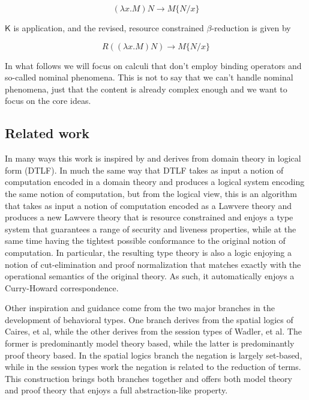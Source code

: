 \documentclass{llncs}
\renewcommand{\:}{\colon}
\begin{document}
\begin{equation*}
  (\lambda x.M)N \rightarrow M\{ N/x \}
\end{equation*}  

$\mathsf{K}$ is application, and the revised, resource constrained $\beta$-reduction is given by

\begin{equation*}
  R((\lambda x.M)N) \rightarrow M\{ N/x \}
\end{equation*}    

In what follows we will focus on calculi that don’t employ binding
operators and so-called nominal phenomena. This is not to say that we
can’t handle nominal phenomena, just that the content is already
complex enough and we want to focus on the core ideas.


\subsection{Related work}
In many ways this work is inspired by and derives from domain theory
in logical form (DTLF). In much the same way that DTLF takes as input
a notion of computation encoded in a domain theory and produces a
logical system encoding the same notion of computation, but from the
logical view, this is an algorithm that takes as input a notion of
computation encoded as a Lawvere theory and produces a new Lawvere
theory that is resource constrained and enjoys a type system that
guarantees a range of security and liveness properties, while at the
same time having the tightest possible conformance to the original
notion of computation. In particular, the resulting type theory is
also a logic enjoying a notion of cut-elimination and proof
normalization that matches exactly with the operational semantics of
the original theory. As such, it automatically enjoys a Curry-Howard
correspondence.

Other inspiration and guidance come from the two major branches in the
development of behavioral types. One branch derives from the spatial
logics of Caires, et al, while the other derives from the session
types of Wadler, et al. The former is predominantly model theory
based, while the latter is predominantly proof theory based. In the
spatial logics branch the negation is largely set-based, while in the
session types work the negation is related to the reduction of
terms. This construction brings both branches together and offers both
model theory and proof theory that enjoys a full abstraction-like
property.
\end{document}
